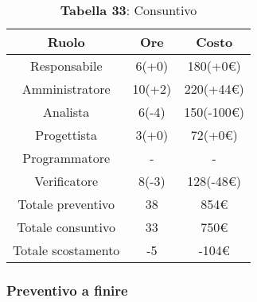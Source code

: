 \begin{table}[H]
	\centering
	\renewcommand{\arraystretch}{1.5}
	\begin{tabular}{|c|c|c|}
		\hline
		\rowcolor{lighter-grayer}
		Ruolo & Ore & Costo \\ \hline
		Responsabile & 6(+0) & 180(+0\euro) \\ \hline
		Amministratore & 10(+2) & 220(+44\euro) \\ \hline
		Analista & 6(-4) & 150(-100\euro) \\ \hline
		Progettista & 3(+0) & 72(+0\euro) \\ \hline
		Programmatore & - & - \\ \hline
		Verificatore & 8(-3) & 128(-48\euro) \\ \hline
		Totale preventivo & 38 & 854\euro \\ \hline
		Totale consuntivo & 33 & 750\euro \\ \hline
		Totale scostamento & -5 & -104\euro \\ \hline
	\end{tabular}
	\caption*{\textbf{Tabella 33}: Consuntivo\\}
\end{table}

\subsubsection{Preventivo a finire}

